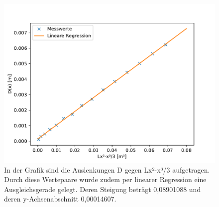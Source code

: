 \documentclass[titlepage = firstcover]{scrartcl}
\begin{document}
        \begin{figure}
          \centering
          \includegraphics[width=0.7\linewidth]{eeins.pdf}
          \caption{In der Grafik sind die Auslenkungen D gegen Lx²-x³/3 aufgetragen. Durch diese Wertepaare wurde zudem per linearer Regression eine Ausgleichsgerade gelegt. Deren Steigung beträgt 0,08901088 und deren y-Achsenabschnitt 0,00014607.}
          \label{fig:graphEeins}
        \end{figure}
\end{document}
